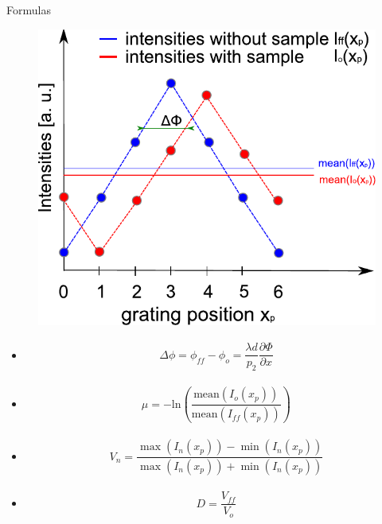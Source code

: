 \begin{frame}{Formulas}

    \vspace{-0.5cm}
    \begin{minipage}{0.5\textwidth}
        \begin{figure}
            \includegraphics[width=0.9\linewidth]{images/formula.pdf}
        \end{figure}
    \end{minipage}\begin{minipage}{0.5\textwidth}
        \begin{itemize}
            \setlength\itemsep{-0.2cm}
            \item \textbf{\color{faublue}{Differential phase image}}
                  \begin{eqnarray*}
                      \Delta \phi = \phi_{ff} - \phi_o = \dfrac{\lambda d}{p_2} \dfrac{\partial\Phi}{\partial x}
                  \end{eqnarray*}

            \item  \textbf{\color{faublue}{Attenuation}}
                  \begin{eqnarray*}
                      \mu = - \text{ln} \left( \dfrac{\text{mean} ( I_{o}(x_p))}{\text{mean} ( I_{ff}(x_p))} \right)
                  \end{eqnarray*}

            \item \textbf{}
                  \begin{eqnarray*}
                      V_n = \dfrac{\max(I_n(x_p)) - \min(I_n(x_p))}{\max(I_n(x_p)) + \min(I_n(x_p))}
                  \end{eqnarray*}

            \item \textbf{\color{faublue}{Dark-field}}
                  \begin{eqnarray*}
                      D = \dfrac{V_{ff}}{V_{o}}
                  \end{eqnarray*}
        \end{itemize}
    \end{minipage}
\end{frame}


